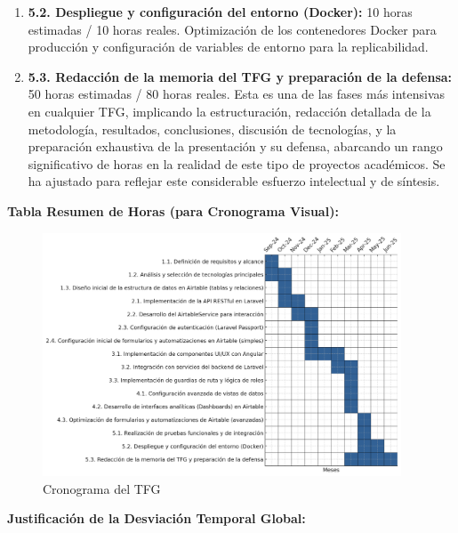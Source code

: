 \begin{enumerate}
\begin{itemize}
\begin{enumerate}
            \item \textbf{5.2. Despliegue y configuración del entorno (Docker):} 10 horas estimadas / 10 horas reales. Optimización de los contenedores Docker para producción y configuración de variables de entorno para la replicabilidad.
            \item \textbf{5.3. Redacción de la memoria del TFG y preparación de la defensa:} 50 horas estimadas / 80 horas reales. Esta es una de las fases más intensivas en cualquier TFG, implicando la estructuración, redacción detallada de la metodología, resultados, conclusiones, discusión de tecnologías, y la preparación exhaustiva de la presentación y su defensa, abarcando un rango significativo de horas en la realidad de este tipo de proyectos académicos. Se ha ajustado para reflejar este considerable esfuerzo intelectual y de síntesis.
        \end{enumerate}
    \end{itemize}
\end{enumerate}

\textbf{Tabla Resumen de Horas (para Cronograma Visual):}

\begin{figure}[H]
    \begin{center}
        \includegraphics[width = 0.95\textwidth]{Figuras/cronograma_tfg.png}
    \end{center}
    \caption{\label{fig:cronograma_tfg} Cronograma del TFG}
\end{figure}

\textbf{Justificación de la Desviación Temporal Global:}

